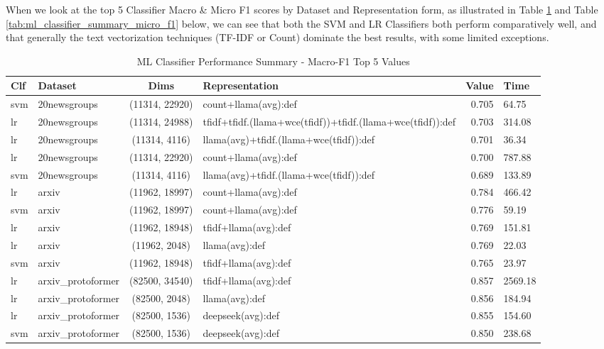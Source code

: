 \documentclass[final]{clv2025}
\begin{document}
When we look at the top 5 Classifier Macro \& Micro F1 scores by Dataset and Representation form, as illustrated in Table \ref{tab:ml_classifier_summary_macro_f1} and Table \ref{tab:ml_classifier_summary_micro_f1} below, we can see that both the SVM and LR Classifiers both perform comparatively well, and that generally the text vectorization techniques (TF-IDF or Count) dominate the best results, with some limited exceptions. 

\begin{table}[h!]
\centering
\scriptsize
\caption{ML Classifier Performance Summary - Macro-F1 Top 5 Values}
\label{tab:ml_classifier_summary_macro_f1}
\begin{tabular}{@{}p{.7cm} p{1.8cm} c >{\raggedright\arraybackslash}p{6.1cm} r p{1.0cm}@{}}
\toprule
\textbf{Clf} & \textbf{Dataset} & \textbf{Dims} & \textbf{Representation} & \textbf{Value} & \textbf{Time} \\
\midrule
svm & 20newsgroups & (11314, 22920) & count+llama(avg):def & 0.705 & 64.75 \\
lr & 20newsgroups & (11314, 24988) & tfidf+tfidf.(llama+wce(tfidf))+tfidf.(llama+wce(tfidf)):def & 0.703 & 314.08 \\
lr & 20newsgroups & (11314, 4116) & llama(avg)+tfidf.(llama+wce(tfidf)):def & 0.701 & 36.34 \\
lr & 20newsgroups & (11314, 22920) & count+llama(avg):def & 0.700 & 787.88 \\
svm & 20newsgroups & (11314, 4116) & llama(avg)+tfidf.(llama+wce(tfidf)):def & 0.689 & 133.89 \\
\midrule
lr & arxiv & (11962, 18997) & count+llama(avg):def & 0.784 & 466.42 \\
svm & arxiv & (11962, 18997) & count+llama(avg):def & 0.776 & 59.19 \\
lr & arxiv & (11962, 18948) & tfidf+llama(avg):def & 0.769 & 151.81 \\
lr & arxiv & (11962, 2048) & llama(avg):def & 0.769 & 22.03 \\
svm & arxiv & (11962, 18948) & tfidf+llama(avg):def & 0.765 & 23.97 \\
\midrule
lr & arxiv\_protoformer & (82500, 34540) & tfidf+llama(avg):def & 0.857 & 2569.18 \\
lr & arxiv\_protoformer & (82500, 2048) & llama(avg):def & 0.856 & 184.94 \\
lr & arxiv\_protoformer & (82500, 1536) & deepseek(avg):def & 0.855 & 154.60 \\
svm & arxiv\_protoformer & (82500, 1536) & deepseek(avg):def & 0.850 & 238.68 \\

\end{tabular}
\end{table}
\end{document}

